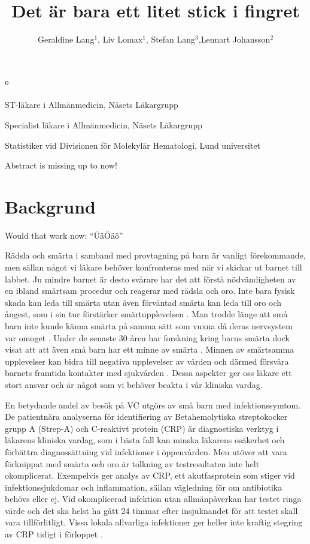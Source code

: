 \documentclass[12pt,twocolumn]{article}
\title{Det är bara ett litet stick i fingret}
\author{Geraldine Lang$^{1}$, Liv Lomax$^1$, Stefan Lang$^3$,Lennart
Johansson$^2$}
\newenvironment{affiliations}{%
    \setcounter{enumi}{1}%
    \setlength{\parindent}{0in}%
    \slshape\sloppy%
    \begin{list}{\upshape$^{\arabic{enumi}}$}{%
        \usecounter{enumi}%
        \setlength{\leftmargin}{0in}%
        \setlength{\topsep}{0in}%
        \setlength{\labelsep}{0in}%
        \setlength{\labelwidth}{0in}%
        \setlength{\listparindent}{0in}%
        \setlength{\itemsep}{0ex}%
        \setlength{\parsep}{0in}%
        }
    }{\end{list}\par\vspace{12pt}}
\renewenvironment{abstract}{%
    \setlength{\parindent}{0in}%
    \setlength{\parskip}{0in}%
    \bfseries%
    }{\par\vspace{-6pt}}
\begin{document}
\onecolumn

\maketitle

\begin{affiliations}
 \item ST-läkare i Allmänmedicin, Näsets Läkargrupp
 \item Specialist läkare i Allmänmedicin, Näsets Läkargrupp
 \item Statistiker vid Divisionen för Molekylär Hematologi, Lund universitet
\end{affiliations}

\begin{abstract}
Abstract is missing up to now!
\end{abstract}


\twocolumn

\newpage

\section{Backgrund}

Would that work now: ``ÜäÖäö''

Rädsla och smärta i samband med provtagning på barn är vanligt
förekommande, men sällan något vi läkare behöver konfronteras med
när vi skickar ut barnet till labbet. Ju mindre barnet är desto svårare
har det att förstå nödvändigheten av en ibland smärtsam procedur och
reagerar med rädsla och oro. Inte bara fysisk skada kan leda till smärta
utan även förväntad smärta kan leda till oro och ångest, som i sin
tur förstärker smärtupplevelsen \cite{Carverius2014}.
Man trodde länge att små barn inte kunde känna smärta på samma
sätt som vuxna då deras nervsystem var omoget \cite{Rey1993}. Under de
senaste 30
åren har forskning kring barns smärta dock visat att att även små
barn har ett minne av smärta \cite{Anand2007,Fitzgerald2001,Schechter2003}.
Minnen av smärtsamma upplevelser kan bidra till negativa upplevelser av
vården och därmed försvåra barnets framtida kontakter med
sjukvården \cite{vBayer2004}. Dessa aspekter ger oss läkare ett stort
ansvar och är något som vi behöver beakta i vår kliniska vardag.

En betydande andel av besök på VC utgörs av små barn med
infektionssymtom. De patientnära analyserna för identifiering av
Betahemolytiska streptokocker grupp A (Strep-A) och C-reaktivt protein (CRP)
är diagnostiska verktyg i läkarens kliniska vardag, som i bästa fall kan
minska läkarens osäkerhet och förbättra diagnossättning vid
infektioner i öppenvården. Men utöver att vara förknippat med smärta
och oro är tolkning av testresultaten inte helt okomplicerat.
Exempelvis ger analys av CRP, ett akutfasprotein som stiger vid
infektionssjukdomar och inflammation, sällan vägledning för om antibiotika
behövs eller ej. Vid okomplicerad infektion utan allmänpåverkan har
testet ringa värde och det ska helst ha gått 24 timmar efter insjuknandet
för att testet skall vara tillförlitligt. Vissa lokala allvarliga
infektioner ger heller inte kraftig stegring av CRP tidigt i förloppet
\cite{Tecken2014}.
\end{document}
